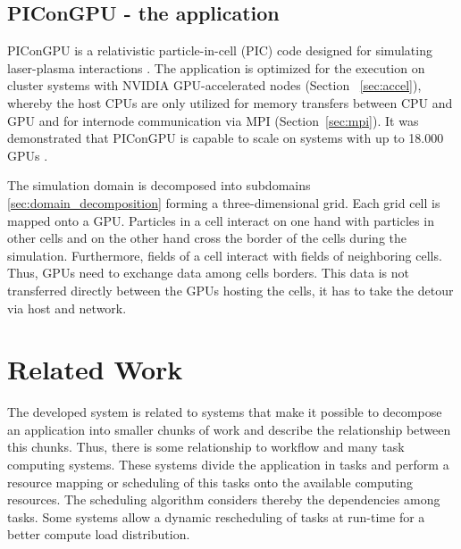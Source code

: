\subsection{PIConGPU - the application}
\label{sec:picongpu}

PIConGPU is a relativistic particle-in-cell (PIC) code designed for
simulating laser-plasma interactions \cite{ref:picongpu}. The
application is optimized for the execution on cluster systems with
NVIDIA GPU-accelerated nodes (Section~ \ref{sec:accel}), whereby the
host CPUs are only utilized for memory transfers between CPU and GPU
and for internode communication via MPI (Section~\ref{sec:mpi}). It
was demonstrated that PIConGPU is capable to scale on systems with up
to 18.000 GPUs \cite{ref:picongpu_scale}.

The simulation domain is decomposed into subdomains
\ref{sec:domain_decomposition} forming a three-dimensional grid. Each
grid cell is mapped onto a GPU. Particles in a cell interact on one
hand with particles in other cells and on the other hand cross the
border of the cells during the simulation. Furthermore, fields of a
cell interact with fields of neighboring cells. Thus, GPUs need to
exchange data among cells borders. This data is not transferred
directly between the GPUs hosting the cells, it has to take the detour
via host and network.

\section{Related Work}
\label{sec:related_work}
The developed system is related to systems that make it possible to
decompose an application into smaller chunks of work and describe the
relationship between this chunks.  Thus, there is some relationship to
workflow and many task computing systems. These systems divide the
application in tasks and perform a resource mapping or scheduling of
this tasks onto the available computing resources. The scheduling
algorithm considers thereby the dependencies among tasks. Some systems
allow a dynamic rescheduling of tasks at run-time for a better compute
load distribution.

